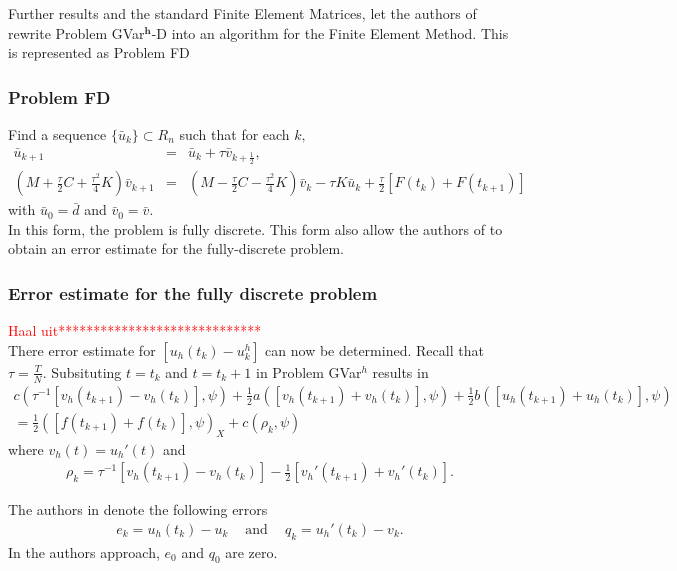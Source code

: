 \documentclass[../../main.tex]{subfiles}
\begin{document}
Further results and the standard Finite Element Matrices, let the authors of \cite{BV13} rewrite Problem GVar$^\mathbf{{h}}$-D into an algorithm for the Finite Element Method. This is represented as Problem FD

\subsubsection*{Problem FD}
Find a sequence $\{\bar{u}_{k}\}\subset R_{n}$ such that for each $k,$
\begin{eqnarray*}
	\bar{u}_{k+1}\ & = & \bar{u}_{k}+\tau\bar{v}_{k+\frac{1}{2}},\\
	(M + \frac{\tau}{2}C+\frac{\tau^{2}}{4}K)\bar{v}_{k+1} & = & (M- \frac{\tau}{2}C-\frac{\tau^{2}}{4}K)\bar{v}_{k}-\tau K\bar{u}_{k}+\frac{\tau}{2}[F(t_{k})+F(t_{k+1})]
\end{eqnarray*}
with $\bar{u}_{0}=\bar{d}$ and $\bar{v}_{0}=\bar{v}.$\\

In this form, the problem is fully discrete. This form also allow the authors of \cite{BV13} to obtain an error estimate for the fully-discrete problem.

\subsubsection{Error estimate for the fully discrete problem}

\textcolor{red}{Haal uit*****************************}\\
There error estimate for $[u_h(t_k) - u^h_k]$ can now be determined. Recall that $\tau = \frac{T}{N}$. Subsituting $t = t_k$ and $t = t_k+1$ in Problem GVar$^h$ results in
\begin{eqnarray*}
	c( \tau^{-1}[v_{h}(t_{k+1})-v_{h}(t_{k})], \psi)+\frac{1}{2}a([v_{h}(t_{k+1})+v_{h}(t_{k})], \psi)+\frac{1}{2}b([u_{h}(t_{k+1})+u_{h}(t_{k})], \psi) \\
	=\frac{1}{2}([f(t_{k+1})+f(t_{k})], \psi)_{X}+c(\rho_{k}, \psi)
\end{eqnarray*}
where $v_{h}(t)=u_{h}'(t)$ and
\begin{eqnarray*}
	\rho_{k}=\tau^{-1}[v_{h}(t_{k+1})-v_{h}(t_{k})]-\frac{1}{2}[v_{h}'(t_{k+1})+v_{h}'(t_{k})].
\end{eqnarray*}

The authors in \cite{BV13} denote the following errors
\begin{eqnarray*}
	e_{k}=u_{h}(t_{k})-u_{k} \ \ \ \ \textrm{ and } \ \ \ \ q_{k}=u_{h}'(t_{k})-v_{k}.
\end{eqnarray*} In the authors approach, $e_0$ and $q_0$ are zero.
\end{document}
